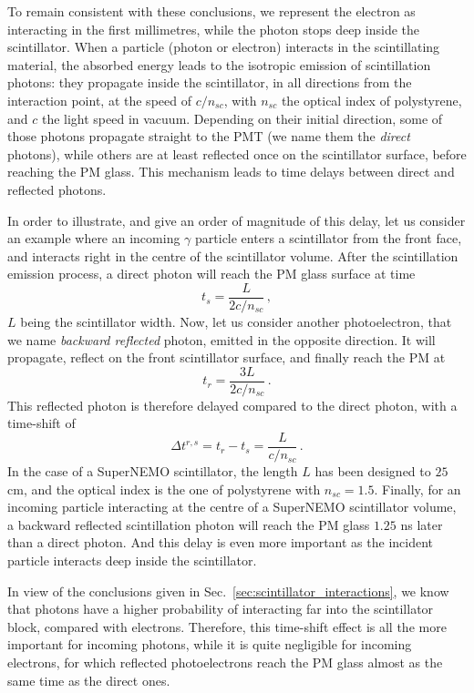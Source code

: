 To remain consistent with these conclusions, we represent the electron as interacting in the first millimetres, while the photon stops deep inside the scintillator.
When a particle (photon or electron) interacts in the scintillating material, the absorbed energy leads to the isotropic emission of scintillation photons:
they propagate inside the scintillator, in all directions from the interaction point, at the speed of $c/n_{sc}$, with $n_{sc}$ the optical index of polystyrene, and $c$ the light speed in vacuum.
Depending on their initial direction, some of those photons propagate straight to the PMT (we name them the \emph{direct} photons), while others are at least reflected once on the scintillator surface, before reaching the PM glass.
This mechanism leads to time delays between direct and reflected photons.

In order to illustrate, and give an order of magnitude of this delay, let us consider an example where an incoming $\gamma$ particle enters a scintillator from the front face, and interacts right in the centre of the scintillator volume.
After the scintillation emission process, a direct photon will reach the PM glass surface at time
\begin{equation}
  t_{s} = \frac{L}{2c/n_{sc}}\,,
\end{equation}
$L$ being the scintillator width.
Now, let us consider another photoelectron, that we name \emph{backward reflected} photon, emitted in the opposite direction.
It will propagate, reflect on the front scintillator surface, and finally reach the PM at
\begin{equation}
  t_{r} = \frac{3L}{2c/n_{sc}}\,.
\end{equation}
This reflected photon is therefore delayed compared to the direct photon, with a time-shift of
\begin{equation}
  \Delta t^{r,s} = t_{r} - t_{s} = \frac{L}{c/n_{sc}}\,.
\end{equation}
In the case of a SuperNEMO scintillator, the length $L$ has been designed to $25$ cm, and the optical index is the one of polystyrene with $n_{sc}=1.5$.
Finally, for an incoming particle interacting at the centre of a SuperNEMO scintillator volume, a backward reflected scintillation photon will reach the PM glass $1.25$ ns later than a direct photon.
And this delay is even more important as the incident particle interacts deep inside the scintillator.

In view of the conclusions given in Sec.~\ref{sec:scintillator_interactions}, we know that photons have a higher probability of interacting far into the scintillator block, compared with electrons.
Therefore, this time-shift effect is all the more important for incoming photons, while it is quite negligible for incoming electrons, for which reflected photoelectrons reach the PM glass almost as the same time as the direct ones.

